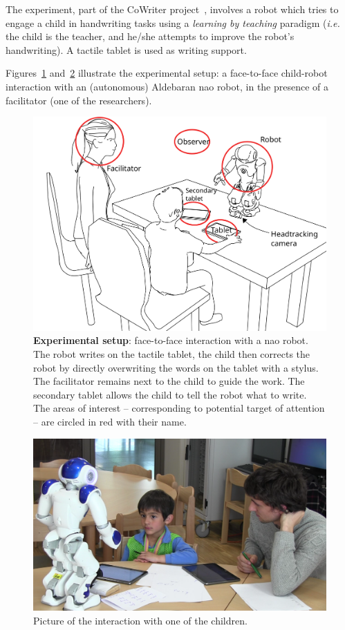 \documentclass{sig-alternate}
\newcommand{\ie}{\textit{i.e.}\xspace}
\begin{document}
The experiment, part of the CoWriter project~\cite{Hood:2015}, involves a robot
which tries to engage a child in handwriting tasks using a \emph{learning by
teaching} paradigm (\ie the child is the teacher, and he/she attempts to improve
the robot's handwriting). A tactile tablet is used as writing support.

Figures~\ref{fig:setup} and~\ref{fig:realSetup} illustrate the experimental
setup: a face-to-face child-robot interaction with an (autonomous) Aldebaran
{\sc nao} robot, in the presence of a facilitator (one of the researchers).

\begin{figure}[h!]
    \centering
    \includegraphics[width=0.8\columnwidth]{experimental_setup}
    \caption{\small \textbf{Experimental setup}: face-to-face interaction with a {\sc
            nao} robot. The robot writes on the tactile tablet, the child then
            corrects the robot by directly overwriting the words on the tablet
            with a stylus. The facilitator remains next to the child to guide the work. 
            The secondary tablet allows the child to tell the robot what to
            write. The areas of interest -- corresponding to potential target of
            attention -- are circled in red with their name.}
    \label{fig:setup}
\end{figure}


\begin{figure}[h!]
    \centering
    \includegraphics[width=1\columnwidth]{realSetup}
    \caption{\small Picture of the interaction with one of the children.}
    \label{fig:realSetup}
\end{figure}
\end{document}
